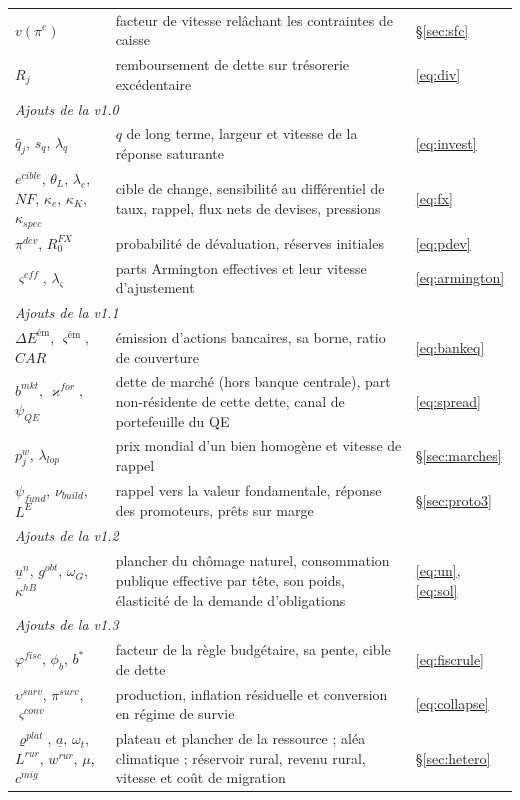 \documentclass[11pt,a4paper]{article}
\begin{document}
\begin{longtable}{p{4.3cm}p{7.8cm}p{3.3cm}}
$v(\pi^e)$ & facteur de vitesse relâchant les contraintes de caisse & \S\ref{sec:sfc}\\
$R_j$ & remboursement de dette sur trésorerie excédentaire & \eqref{eq:div}\\
\midrule
\multicolumn{3}{l}{\emph{Ajouts de la v1.0}}\\
$\bar q_j$, $s_q$, $\lambda_q$ & $q$ de long terme, largeur et vitesse de la réponse saturante & \eqref{eq:invest}\\
$e^{cible}$, $\theta_L$, $\lambda_e$, $NF$, $\kappa_e$, $\kappa_K$, $\kappa_{spec}$ & cible de change, sensibilité au différentiel de taux, rappel, flux nets de devises, pressions & \eqref{eq:fx}\\
$\pi^{dev}$, $R^{FX}_0$ & probabilité de dévaluation, réserves initiales & \eqref{eq:pdev}\\
$\varsigma^{eff}$, $\lambda_\varsigma$ & parts Armington effectives et leur vitesse d'ajustement & \eqref{eq:armington}\\
\midrule
\multicolumn{3}{l}{\emph{Ajouts de la v1.1}}\\
$\Delta E^{\text{ém}}$, $\varsigma^{\text{ém}}$, $CAR$ & émission d'actions bancaires, sa borne, ratio de couverture & \eqref{eq:bankeq}\\
$b^{mkt}$, $\varkappa^{for}$, $\psi_{QE}$ & dette de marché (hors banque centrale), part non-résidente de cette dette, canal de portefeuille du QE & \eqref{eq:spread}\\
$p^w_j$, $\lambda_{lop}$ & prix mondial d'un bien homogène et vitesse de rappel & \S\ref{sec:marches}\\
$\psi_{fund}$, $\nu_{build}$, $L^E$ & rappel vers la valeur fondamentale, réponse des promoteurs, prêts sur marge & \S\ref{sec:proto3}\\
\midrule
\multicolumn{3}{l}{\emph{Ajouts de la v1.2}}\\
$\underline u^n$, $g^{obt}$, $\omega_G$, $\kappa^{hB}$ & plancher du chômage naturel, consommation publique effective par tête, son poids, élasticité de la demande d'obligations & \eqref{eq:un}, \eqref{eq:sol}\\
\midrule
\multicolumn{3}{l}{\emph{Ajouts de la v1.3}}\\
$\varphi^{fisc}$, $\phi_b$, $b^\ast$ & facteur de la règle budgétaire, sa pente, cible de dette & \eqref{eq:fiscrule}\\
$\upsilon^{surv}$, $\pi^{surv}$, $\varsigma^{conv}$ & production, inflation résiduelle et conversion en régime de survie & \eqref{eq:collapse}\\
$\varrho^{plat}$, $\underline a$, $\omega_t$, $L^{rur}$, $w^{rur}$, $\mu$, $c^{mig}$ & plateau et plancher de la ressource ; aléa climatique ; réservoir rural, revenu rural, vitesse et coût de migration & \S\ref{sec:hetero}\\
\bottomrule
\end{longtable}
\normalsize
\newpage
\end{document}

